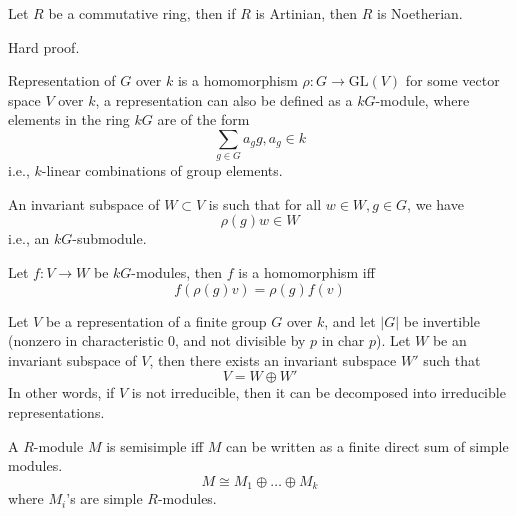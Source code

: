 \documentclass[openany]{book}
\newcommand{\gl}{\text{GL}}
\begin{document}
\begin{prop}
    Let $R$ be a commutative ring, then if $R$ is Artinian, then $R$ is Noetherian.
\end{prop}
Hard proof.



\begin{defn}[representation]
    Representation of $G$ over $k$ is a homomorphism $\rho:G\to\gl(V)$ for some vector space $V$ over $k$, a representation can also be defined as a $kG$-module, where elements in the ring $kG$ are of the form 
    \begin{equation*}
        \sum_{g\in G}a_gg, a_g\in k
    \end{equation*}
    i.e., $k$-linear combinations of group elements.

    An invariant subspace of $W\subset V$ is such that for all $w\in W, g\in G$, we have 
    \begin{equation*}
        \rho(g)w\in W
    \end{equation*}
    i.e., an $kG$-submodule.
\end{defn}

\begin{defn}
    Let $f:V\to W$ be $kG$-modules, then $f$ is a homomorphism iff 
    \begin{equation*}
        f(\rho(g)v)=\rho(g)f(v)
    \end{equation*}
\end{defn}

\begin{prop}
    Let $V$ be a representation of a finite group $G$ over $k$, and let $|G|$ be invertible (nonzero in characteristic $0$, and not divisible by $p$ in char $p$). Let $W$ be an invariant subspace of $V$, then there exists an invariant subspace $W'$ such that 
    \begin{equation*}
        V=W\oplus W'
    \end{equation*}
    In other words, if $V$ is not irreducible, then it can be decomposed into irreducible representations.
\end{prop}

\begin{defn}[semisimple]
    A $R$-module $M$ is semisimple iff $M$ can be written as a finite direct sum of simple modules.
    \begin{equation*}
        M\cong M_1\oplus \dots\oplus M_k
    \end{equation*}
    where $M_i$'s are simple $R$-modules.
\end{defn}
\end{document}
